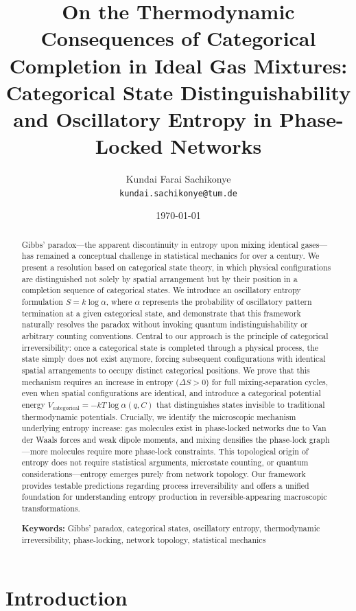 \documentclass[12pt,a4paper]{article}
\title{On the Thermodynamic Consequences of Categorical Completion in Ideal Gas Mixtures:  Categorical State Distinguishability and Oscillatory Entropy in Phase-Locked Networks}
\author{
Kundai Farai Sachikonye\\
\texttt{kundai.sachikonye@tum.de}
}
\date{\today}
\theoremstyle{remark}
\begin{document}
\maketitle

\begin{abstract}
Gibbs' paradox—the apparent discontinuity in entropy upon mixing identical gases—has remained a conceptual challenge in statistical mechanics for over a century. We present a resolution based on categorical state theory, in which physical configurations are distinguished not solely by spatial arrangement but by their position in a completion sequence of categorical states. We introduce an oscillatory entropy formulation $S = k \log \alpha$, where $\alpha$ represents the probability of oscillatory pattern termination at a given categorical state, and demonstrate that this framework naturally resolves the paradox without invoking quantum indistinguishability or arbitrary counting conventions. Central to our approach is the principle of categorical irreversibility: once a categorical state is completed through a physical process, the state simply does not exist anymore, forcing subsequent configurations with identical spatial arrangements to occupy distinct categorical positions. We prove that this mechanism requires an increase in entropy ($\Delta S > 0$) for full mixing-separation cycles, even when spatial configurations are identical, and introduce a categorical potential energy $V_\text{categorical} = -kT \log \alpha(q, C)$ that distinguishes states invisible to traditional thermodynamic potentials. Crucially, we identify the microscopic mechanism underlying entropy increase: gas molecules exist in phase-locked networks due to Van der Waals forces and weak dipole moments, and mixing densifies the phase-lock graph—more molecules require more phase-lock constraints. This topological origin of entropy does not require statistical arguments, microstate counting, or quantum considerations—entropy emerges purely from network topology. Our framework provides testable predictions regarding process irreversibility and offers a unified foundation for understanding entropy production in reversible-appearing macroscopic transformations.

\textbf{Keywords:} Gibbs' paradox, categorical states, oscillatory entropy, thermodynamic irreversibility, phase-locking, network topology, statistical mechanics
\end{abstract}

\section{Introduction}
\end{document}
